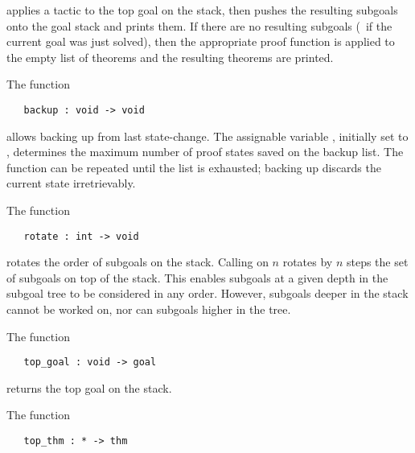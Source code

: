 \noindent applies a tactic to the top goal on the stack, then pushes the resulting
subgoals onto the goal stack and prints them. If there are no
resulting subgoals (\ie\ if the current goal was just solved), then
the appropriate proof function
is applied to the empty list of theorems and the resulting theorems are printed.

The function

\begin{boxed}\begin{verbatim}
   backup : void -> void
\end{verbatim}\end{boxed}

\noindent allows backing up from last state-change.  The assignable variable
,
initially set to , determines the maximum number
of proof states saved
on the backup list.  The function  can be repeated until the list is
exhausted; backing up discards the current state irretrievably.

The function

\begin{boxed}\begin{verbatim}
   rotate : int -> void
\end{verbatim}\end{boxed}

\noindent rotates the order of subgoals on the stack.  Calling
 on $n$
rotates by $n$ steps the set of subgoals on top of the
stack.  This enables
subgoals at a given depth
in the subgoal tree to
be considered in any order.  However, subgoals deeper in the stack
cannot be worked on, nor can subgoals higher in the tree.

The function

\begin{boxed}\begin{verbatim}
   top_goal : void -> goal
\end{verbatim}\end{boxed}

\noindent returns the top goal on the stack.

The function

\begin{boxed}\begin{verbatim}
   top_thm : * -> thm
\end{verbatim}\end{boxed}

